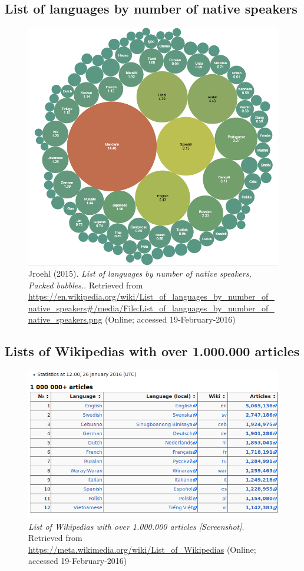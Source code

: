 \subsection{List of languages by number of native speakers}
\begin{figure}[H]
	\centering
	\includegraphics[width=\textwidth]{diagrams/List_of_languages_by_number_of_native_speakers.png}
	\caption[a figure]{Jroehl (2015). \textit{List of languages by number of native speakers, Packed bubbles.}. Retrieved from \url{https://en.wikipedia.org/wiki/List\_of\_languages\_by\_number\_of\_native\_speakers\#/media/File:List\_of\_languages\_by\_number\_of\_native\_speakers.png} (Online; accessed 19-February-2016)}
	\label{fig:listLang}
\end{figure}

\subsection{Lists of Wikipedias with over 1.000.000 articles}
\begin{figure}[H]
	\centering
	\includegraphics[width=\textwidth]{diagrams/list-of-wikis-articles.png}
	\caption[a figure]{\textit{List of Wikipedias with over 1.000.000 articles [Screenshot]}. Retrieved from \url{https://meta.wikimedia.org/wiki/List\_of\_Wikipedias} (Online; accessed 19-February-2016)}
	\label{fig:wikipedias-articles}
\end{figure}